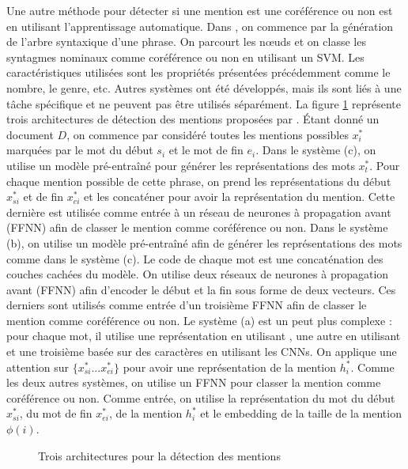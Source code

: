 \documentclass{KodeBook}
\begin{document}
Une autre méthode pour détecter si une mention est une coréférence ou non est en utilisant l'apprentissage automatique. 
Dans \cite{2013-uryupina-moschitti}, on commence par la génération de l'arbre syntaxique d'une phrase. 
On parcourt les nœuds et on classe les syntagmes nominaux comme coréférence ou non en utilisant un SVM. 
Les caractéristiques utilisées sont les propriétés présentées précédemment comme le nombre, le genre, etc.
Autres systèmes ont été développés, mais ils sont liés à une tâche spécifique et ne peuvent pas être utilisés séparément. 
La figure \ref{fig:det-mention-yu} représente trois architectures de détection des mentions proposées par \cite{2020-yu-al}. 
Étant donné un document $D$, on commence par considéré toutes les mentions possibles $x^*_i$ marquées par le mot du début $s_i$ et le mot de fin $e_i$. 
Dans le système (c), on utilise un modèle  pré-entraîné pour générer les représentations des mots $x^*_t$. 
Pour chaque mention possible de cette phrase, on prend les représentations du début $x^*_{si}$ et de fin $x^*_{ei}$ et les concaténer pour avoir la représentation du mention. 
Cette dernière est utilisée comme entrée à un réseau de neurones à propagation avant (FFNN) afin de classer le mention comme coréférence ou non. 
Dans le système (b), on utilise un modèle  pré-entraîné afin de générer les représentations des mots comme dans le système (c). 
Le code de chaque mot est une concaténation des couches cachées du modèle.
On utilise deux réseaux de neurones à propagation avant (FFNN) afin d'encoder le début et la fin sous forme de deux vecteurs. 
Ces derniers sont utilisés comme entrée d'un troisième FFNN afin de classer le mention comme coréférence ou non. 
Le système (a) est un peut plus complexe : pour chaque mot, il utilise une représentation en utilisant , une autre en utilisant  et une troisième basée sur des caractères en utilisant les CNNs. 
On applique une attention sur $\{x^*_{si}\ldots x^*_{ei}\}$ pour avoir une représentation de la mention $h^*_i$. 
Comme les deux autres systèmes, on utilise un FFNN pour classer la mention comme coréférence ou non. 
Comme entrée, on utilise la représentation du mot du début $x^*_{si}$, du mot de fin $x^*_{ei}$, de la mention $h^*_i$ et le embedding de la taille de la mention $\phi(i)$.
\begin{figure}[ht]
	\centering
	\caption{Trois architectures pour la détection des mentions \cite{2020-yu-al}}
	\label{fig:det-mention-yu}
\end{figure}
\end{document}
